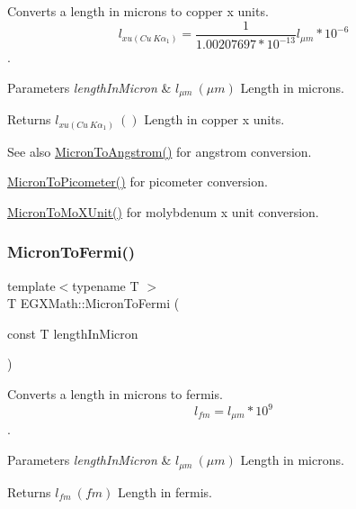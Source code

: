 Converts a length in microns to copper x units. \[ l_{xu(Cu\ K\alpha_1)}= \frac{1}{1.00207697*10^{-13}} l_{\mu m} * 10^{-6}\]. 


\begin{DoxyParams}{Parameters}
{\em length\+In\+Micron} & $ l_{\mu m}\ (\mu m)$ Length in microns. \\
\hline
\end{DoxyParams}
\begin{DoxyReturn}{Returns}
$ l_{xu(Cu\ K\alpha_1)}\ ()$ Length in copper x units. 
\end{DoxyReturn}
\begin{DoxySeeAlso}{See also}
\mbox{\hyperlink{group___e_g_x_math-_conversions-_length_conversions-_non-_s_i-_micron-_non-_s_i_ga34f8c07bfb65b584298dd7be114b85ad}{Micron\+To\+Angstrom()}} for angstrom conversion. 

\mbox{\hyperlink{group___e_g_x_math-_conversions-_length_conversions-_non-_s_i-_micron-_s_i_ga6e091e653fd9efb8769cc131fcbc41bc}{Micron\+To\+Picometer()}} for picometer conversion. 

\mbox{\hyperlink{group___e_g_x_math-_conversions-_length_conversions-_non-_s_i-_micron-_non-_s_i_ga4bdfec28657cb037fc0830a95ceb79ca}{Micron\+To\+Mo\+X\+Unit()}} for molybdenum x unit conversion. 
\end{DoxySeeAlso}
\mbox{\label{group___e_g_x_math-_conversions-_length_conversions-_non-_s_i-_micron-_non-_s_i_ga15284641d32129d8a82d4e50eaea346d}} 
\subsubsection{\texorpdfstring{Micron\+To\+Fermi()}{MicronToFermi()}}
{\footnotesize\ttfamily template$<$typename T $>$ \\
T E\+G\+X\+Math\+::\+Micron\+To\+Fermi (\begin{DoxyParamCaption}\item[{const T}]{length\+In\+Micron }\end{DoxyParamCaption})}



Converts a length in microns to fermis. \[ l_{fm}=l_{\mu m} * 10^{9} \]. 


\begin{DoxyParams}{Parameters}
{\em length\+In\+Micron} & $ l_{\mu m}\ (\mu m)$ Length in microns. \\
\hline
\end{DoxyParams}
\begin{DoxyReturn}{Returns}
$ l_{fm}\ (fm)$ Length in fermis. 
\end{DoxyReturn}
\mbox{\label{group___e_g_x_math-_conversions-_length_conversions-_non-_s_i-_micron-_non-_s_i_ga4bdfec28657cb037fc0830a95ceb79ca}} 
